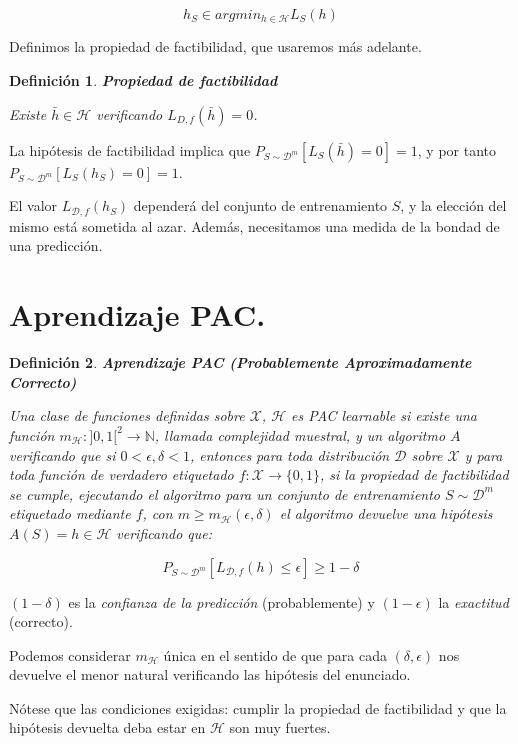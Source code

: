 \documentclass[11pt]{article}
\newtheorem{definition}{Definición}
\begin{document}
\[h_S \in argmin_{h\in \mathcal{H}} L_S(h)\]

Definimos la propiedad de factibilidad, que usaremos más adelante.

\begin{definition}
\textbf{Propiedad de factibilidad}

Existe  $\bar{h} \in \mathcal{H}$ verificando $L_{D,f}(\bar{h}) = 0$.
\end{definition}

La hipótesis de factibilidad implica que $P_{S\sim \mathcal{D}^m}[L_S(\bar{h})=0] = 1$, y por tanto $P_{S\sim \mathcal{D}^m}[L_S(h_S)=0]=1$.

El valor $L_{\mathcal{D},f}(h_S)$ dependerá del conjunto de entrenamiento $S$, y la elección del mismo está sometida al azar. Además, necesitamos una medida de la bondad de una predicción.

\section{Aprendizaje PAC.}
\label{sec-2}

\begin{definition}
\textbf{Aprendizaje PAC (Probablemente Aproximadamente Correcto)}

Una clase de funciones definidas sobre $\mathcal{X}$, $\mathcal{H}$ es PAC learnable si existe una función $m_{\mathcal{H}} : ]0,1[^2\rightarrow \mathbb{N}$, llamada complejidad muestral, y un algoritmo $A$ verificando que si $0 < \epsilon, \delta < 1$, entonces para toda distribución $\mathcal{D}$ sobre $\mathcal{X}$ y para toda función de verdadero etiquetado $f:\mathcal{X} \rightarrow \{0,1\}$, si la propiedad de factibilidad se cumple, ejecutando el algoritmo para un conjunto de entrenamiento $S\sim \mathcal{D}^m$ etiquetado mediante $f$, con $m\ge m_{\mathcal{H}}(\epsilon, \delta)$ el algoritmo devuelve una hipótesis $A(S) = h\in \mathcal{H}$ verificando que:

\[P_{S\sim \mathcal{D}^m}[L_{\mathcal{D},f}(h) \le \epsilon] \ge 1-\delta\]
\end{definition}

$(1-\delta)$ es la \emph{confianza de la predicción} (probablemente) y $(1-\epsilon)$ la \emph{exactitud} (correcto).

Podemos considerar $m_{\mathcal{H}}$ única en el sentido de que para cada $(\delta, \epsilon)$ nos devuelve el menor natural verificando las hipótesis del enunciado.

Nótese que las condiciones exigidas: cumplir la propiedad de factibilidad y que la hipótesis devuelta deba estar en $\mathcal{H}$ son muy fuertes.
\end{document}
